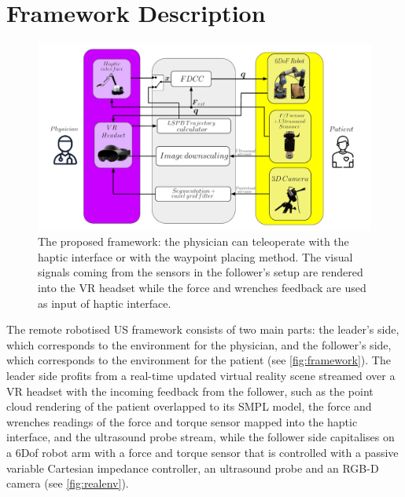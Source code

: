 \newpage
\chapter{Framework Description}
\begin{figure}[t]
    \centering
    \includegraphics[width=1\columnwidth]{images/framework/framework.pdf}
    \caption{The proposed framework: the physician can teleoperate with the haptic interface or with the waypoint placing method. The visual signals coming from the sensors in the follower's setup are rendered into the VR headset while the force and wrenches feedback are used as input of haptic interface.} 
    \label{fig:framework}
\end{figure}

The remote robotised US framework consists of two main parts: the leader's side, which corresponds to the environment for the physician, and the follower's side, which corresponds to the environment for the patient (see \autoref{fig:framework}). The leader side profits from a real-time updated virtual reality scene streamed over a VR headset with the incoming feedback from the follower, such as the point cloud rendering of the patient overlapped to its SMPL model, the force and wrenches readings of the force and torque sensor mapped into the haptic interface, and the ultrasound probe stream, while the follower side capitalises on a 6Dof robot arm with a force and torque sensor that is controlled with a passive variable Cartesian impedance controller, an ultrasound probe and an RGB-D camera (see \autoref{fig:realenv}).

